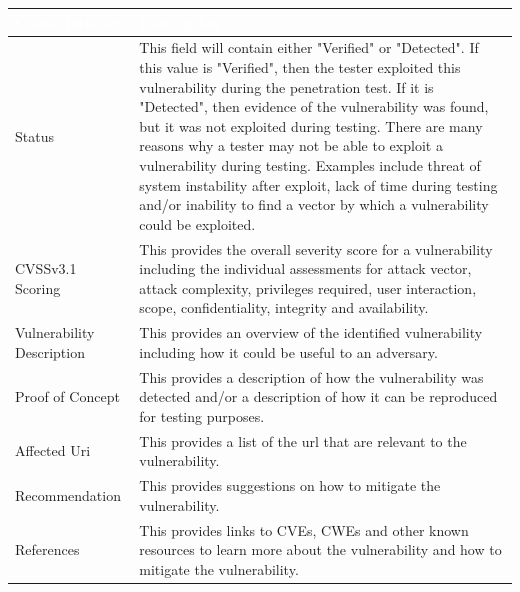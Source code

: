 \documentclass{article}
\begin{document}
            \begin{center}
                \begin{longtable} {|p{9em}|p{31em}|}
                \hline 
                \large \cellcolor{tablecol} \textcolor{white}{\textbf{Characteristics}} & \large \cellcolor{tablecol} \textcolor{white}{\textbf{Description}}   \\    
                \hline
                \normalsize Status & \normalsize This field will contain either "Verified" or "Detected". If this value is "Verified", then the tester exploited this vulnerability during the penetration test. If it is "Detected",
                then evidence of the vulnerability was found, but it was not exploited during testing. There are many reasons why a tester may not be able to exploit a vulnerability
                during testing. Examples include threat of system instability after exploit, lack of time during testing and/or inability to find a vector by which a vulnerability could be exploited.  \\
                \hline
                \normalsize CVSSv3.1 Scoring  & \normalsize This provides the overall severity score for a vulnerability including the individual
                assessments for attack vector, attack complexity, privileges required, user interaction, scope, confidentiality, integrity and availability.  \\
                \hline
                \normalsize Vulnerability Description  & \normalsize This provides an overview of the identified vulnerability including how it could be useful to an adversary. \\
                \hline
                \normalsize Proof of Concept & \normalsize This provides a description of how the vulnerability was detected and/or a description of how it can be reproduced for testing purposes. \\
                \hline
                \normalsize Affected Uri  & \normalsize This provides a list of the url that are relevant to the vulnerability. \\
                \hline
                \normalsize Recommendation & \normalsize This provides suggestions on how to mitigate the vulnerability. \\
                \hline
                \normalsize References & \normalsize This provides links to CVEs, CWEs and other known resources to learn more about the vulnerability and how to mitigate the vulnerability. \\
                \hline
                \end{longtable}   
            \end{center}
            
\end{document}
